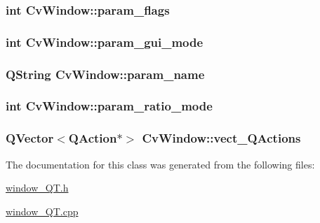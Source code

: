 \label{classCvWindow_a147b82422fa5d532192990f77e6ae2d8}
\hypertarget{classCvWindow_ae79962eeb12c2dbcedafb23362ba1847}{
\subsubsection[{param\_\-flags}]{\setlength{\rightskip}{0pt plus 5cm}int {\bf CvWindow::param\_\-flags}}}
\label{classCvWindow_ae79962eeb12c2dbcedafb23362ba1847}
\hypertarget{classCvWindow_a1503f81d43bec919c329a1c98cb3f559}{
\subsubsection[{param\_\-gui\_\-mode}]{\setlength{\rightskip}{0pt plus 5cm}int {\bf CvWindow::param\_\-gui\_\-mode}}}
\label{classCvWindow_a1503f81d43bec919c329a1c98cb3f559}
\hypertarget{classCvWindow_a2f2e2a14703dbe479049862f5f43ac13}{
\subsubsection[{param\_\-name}]{\setlength{\rightskip}{0pt plus 5cm}QString {\bf CvWindow::param\_\-name}}}
\label{classCvWindow_a2f2e2a14703dbe479049862f5f43ac13}
\hypertarget{classCvWindow_a9d97fe990d3fb23daa031ac39483b059}{
\subsubsection[{param\_\-ratio\_\-mode}]{\setlength{\rightskip}{0pt plus 5cm}int {\bf CvWindow::param\_\-ratio\_\-mode}}}
\label{classCvWindow_a9d97fe990d3fb23daa031ac39483b059}
\hypertarget{classCvWindow_a55d09660aba2ef83bf2eaa4fe80bb746}{
\subsubsection[{vect\_\-QActions}]{\setlength{\rightskip}{0pt plus 5cm}QVector$<$QAction$\ast$$>$ {\bf CvWindow::vect\_\-QActions}}}
\label{classCvWindow_a55d09660aba2ef83bf2eaa4fe80bb746}


The documentation for this class was generated from the following files:\begin{DoxyCompactItemize}
\item 
\hyperlink{window__QT_8h}{window\_\-QT.h}\item 
\hyperlink{window__QT_8cpp}{window\_\-QT.cpp}\end{DoxyCompactItemize}
